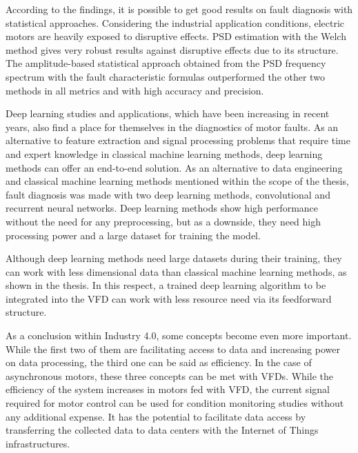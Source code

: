 According to the findings, it is possible to get good results on fault diagnosis with statistical approaches. Considering the industrial application conditions,  electric motors are heavily exposed to disruptive effects. PSD estimation with the Welch method gives very robust results against disruptive effects due to its structure. The amplitude-based statistical approach obtained from the PSD frequency spectrum with the fault characteristic formulas outperformed the other two methods in all metrics and with high accuracy and precision.

Deep learning studies and applications, which have been increasing in recent years, also find a place for themselves in the diagnostics of motor faults. As an alternative to feature extraction and signal processing problems that require time and expert knowledge in classical machine learning methods, deep learning methods can offer an end-to-end solution. As an alternative to data engineering and classical machine learning methods mentioned within the scope of the thesis, fault diagnosis was made with two deep learning methods, convolutional and recurrent neural networks. Deep learning methods show high performance without the need for any preprocessing, but as a downside, they need high processing power and a large dataset for training the model.

Although deep learning methods need large datasets during their training, they can work with less dimensional data than classical machine learning methods, as shown in the thesis. In this respect, a trained deep learning algorithm to be integrated into the VFD can work with less resource need via its feedforward structure.

As a conclusion within Industry 4.0, some concepts become even more important. While the first two of them are facilitating access to data and increasing power on data processing, the third one can be said as efficiency. In the case of asynchronous motors, these three concepts can be met with VFDs. While the efficiency of the system increases in motors fed with VFD, the current signal required for motor control can be used for condition monitoring studies without any additional expense. It has the potential to facilitate data access by transferring the collected data to data centers with the Internet of Things infrastructures.